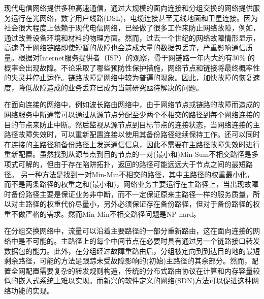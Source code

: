 现代电信网络提供多种高速通信，通过大规模的面向连接和分组交换的网络提供服务运行在光网络，数字用户线路(DSL)，电缆连接甚至无线地面和卫星连接。因为社会很大程度上依赖于现代电信网络，已经做了很多工作来防止网络故障，例如，通过改善设备环境和材料的物理方面。然而，过去一个世纪的网络故障情形显示，高速骨干网络链路即使短暂的故障也会造成大量的数据包丢弃，严重影响通信质量。根据对Internet服务提供者（ISP）的观察，骨干网链路一年内大约有30\% 的概率会出现故障\cite{doerr2014all}。不论采取了哪些预防性保护措施，网络节点和链接将最终概率性的失灵并停止运作。链路故障是网络中较为普遍的现象。因此，加快故障的恢复速度，降低故障造成的业务丢弃已成为当前研究亟待解决的问题。

在面向连接的网络中，例如波长路由网络中，由于网络节点或链路的故障而造成的网络服务中断通常可以通过从源节点分配至少两个不相交的路径到每个网络连接的目的节点来防止中断\cite{kuipers2012overview}。然后监视从源节点到目标节点的连接状态，当网络连接的主路径故障失效时，可以重新配置连接以使用其备份路径继续保持工作。还可以同时在连接的主路径和备份路径上发送通信信息，因此不需要在主路径故障失效时进行重新配置。虽然找到从源节点到目的节点的一对(最小和)Min-Sum不相交路径是多项式可解的\cite{suurballe1974disjoint,suurballe1984quick}，但由于存在陷阱拓扑\cite{dunn1994comparison}，返回的路径可能远远大于节点之间的最短路径\cite{dunn1994comparison}。 另一种方法是找到一对Min-Min不相交的路径，其中主路径的权重最小化，而不是两条路径的权重之和(最小和)，网络业务主要运行在主路径上，当出现故障时备份路径主要是保证业务非中断，而不一定保证原来主路径一样的服务质量，所以对主路径的权重代价尽量小，另外必须保证存在备份路径，但对于备份路径的权重不做严格的需求。然而Min-Min不相交路径问题是NP-hard\cite{guo2013finding}。




在分组交换网络中，流量可以沿着主要路径的一部分重新路由，这在面向连接的网络中是不可能的。主路径上的每个中间节点在必要时具有通过另一个链路接口转发数据包的能力。此外，在分组经过故障重路由后，分组被定向到到达目的地的最短剩余路径，可能的方法是跟踪未受故障影响的(初始)主路径的其余部分。然而，配置全网配置需要复杂的转发规则构造，传统的分布式路由协议在计算和内存容量较低的嵌入式系统上难以实现。而新兴的软件定义的网络(SDN)方法可以促进这种网络功能的实现。

